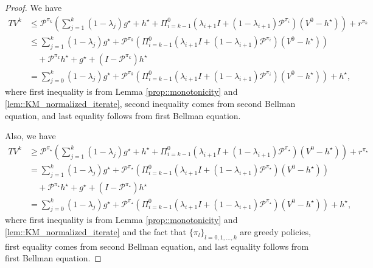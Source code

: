 \documentclass{article} %
\newcommand{\cP}{\mathcal{P}}
\newcommand*{\para}[1]{\left({#1}\right)}
\begin{document}
\begin{proof}
We have
         \begin{align*}
           TV^{k} & \le \cP^{\pi_k}\para{\sum^{k}_{j=1} (1-\lambda_{j})g^{\star}+ h^{\star}+\Pi^{0}_{i=k-1}(\lambda_{i+1}I+(1-\lambda_{i+1}) \cP^{\pi_i}) (V^0-h^{\star})} +r^{\pi_k}
           \\& \le \sum^{k}_{j=1} (1-\lambda_{j})g^{\star}+\cP^{\pi_k}\para{ \Pi^{0}_{i=k-1}(\lambda_{i+1}I+(1-\lambda_{i+1}) \cP^{\pi_i}) (V^0-h^{\star})} \\& \quad +\cP^{\pi_k}h^{\star}+g^{\star}+(I-\cP^{\pi_k})h^{\star}\\& =\sum^{k}_{j=0} (1-\lambda_{j})g^{\star} +\cP^{\pi_k}\para{ \Pi^{0}_{i=k-1}(\lambda_{i+1}I+(1-\lambda_{i+1}) \cP^{\pi_i}) (V^0-h^{\star})}+h^{\star},
       \end{align*}
       where first inequality is from Lemma \ref{prop::monotonicity} and \ref{lem::KM_normalized_iterate}, second inequality comes from second Bellman equation, and last equality follows from first Bellman equation. 

       Also, we have
                \begin{align*}
           TV^{k} & \ge \cP^{\pi_{\star}}\para{\sum^{k}_{j=1} (1-\lambda_{j})g^{\star}+ h^{\star}+\Pi^{0}_{i=k-1}(\lambda_{i+1}I+(1-\lambda_{i+1}) \cP^{\pi_{\star}}) (V^0-h^{\star})} +r^{\pi_{\star}}
           \\& = \sum^{k}_{j=1} (1-\lambda_{j})g^{\star}+\cP^{\pi_{\star}}\para{ \Pi^{0}_{i=k-1}(\lambda_{i+1}I+(1-\lambda_{i+1}) \cP^{\pi_{\star}}) (V^0-h^{\star})}
           \\ &\quad +\cP^{\pi_{\star}}h^{\star}+g^{\star}+(I-\cP^{\pi_{\star}})h^{\star}
           \\& =\sum^{k}_{j=0} (1-\lambda_{j})g^{\star} +\cP^{\pi_{\star}}\para{ \Pi^{0}_{i=k-1}(\lambda_{i+1}I+(1-\lambda_{i+1}) \cP^{\pi_{\star}}) (V^0-h^{\star})}+h^{\star},
       \end{align*}
       where first inequality is from Lemma \ref{prop::monotonicity} and \ref{lem::KM_normalized_iterate} and the fact that $\{\pi_l\}_{l=0,1,\dots,k}$ are greedy policies, first equality comes from second Bellman equation, and last equality follows from first Bellman equation. 
\end{proof} 
\end{document}
